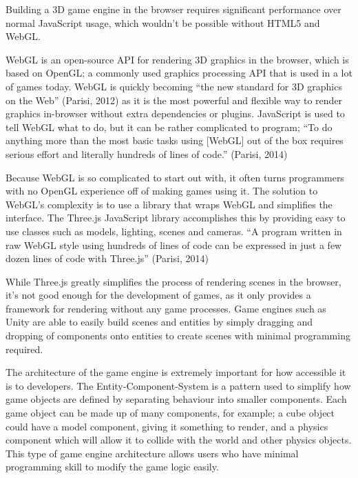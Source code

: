 \documentclass[a4paper, 12pt]{article}
\begin{document}


Building a 3D game engine in the browser requires significant performance over normal JavaScript usage, which wouldn't be possible without HTML5 and WebGL. 



WebGL is an open-source API for rendering 3D graphics in the browser, which is based on OpenGL; a commonly used graphics processing API that is used in a lot of games today. WebGL is quickly becoming ``the new standard for 3D graphics on the Web'' (Parisi, 2012) as it is the most powerful and flexible way to render graphics in-browser without extra dependencies or plugins. JavaScript is used to tell WebGL what to do, but it can be rather complicated to program; ``To do anything more than the most basic tasks using [WebGL] out of the box requires serious effort and literally hundreds of lines of code.'' (Parisi, 2014)



Because WebGL is so complicated to start out with, it often turns programmers with no OpenGL experience off of making games using it. The solution to WebGL's complexity is to use a library that wraps WebGL and simplifies the interface. The Three.js JavaScript library accomplishes this by providing easy to use classes such as models, lighting, scenes and cameras. ``A program written in raw WebGL style using hundreds of lines of code can be expressed in just a few dozen lines of code with Three.js'' (Parisi, 2014)



While Three.js greatly simplifies the process of rendering scenes in the browser, it's not good enough for the development of games, as it only provides a framework for rendering without any game processes. Game engines such as Unity are able to easily build scenes and entities by simply dragging and dropping of components onto entities to create scenes with minimal programming required. 



The architecture of the game engine is extremely important for how accessible it is to developers. The Entity-Component-System is a pattern used to simplify how game objects are defined by separating behaviour into smaller components. Each game object can be made up of many components, for example; a cube object could have a model component, giving it something to render, and a physics component which will allow it to collide with the world and other physics objects. This type of game engine architecture allows users who have minimal programming skill to modify the game logic easily.
\end{document}
